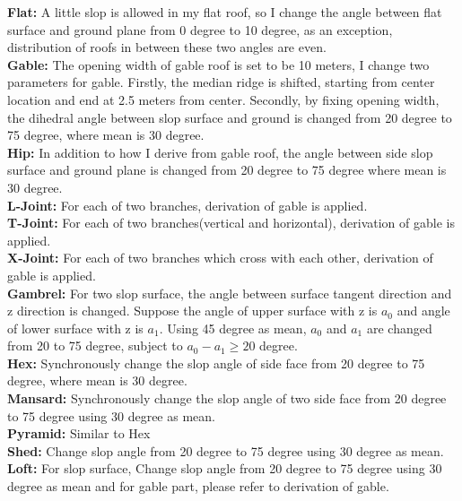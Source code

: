 \documentclass{iitthesis}
\begin{document}
{\noindent \textbf{Flat:}} A little slop is allowed in my flat roof, so I change the angle between flat surface and ground plane from 0 degree to 10 degree, as an exception, distribution of roofs in between these two angles are even.
\\ \textbf{Gable:} The opening width of gable roof is set to be 10 meters, I change two parameters for gable. Firstly, the median ridge is shifted, starting from center location and end at 2.5 meters from center. Secondly, by fixing opening width, the dihedral angle between slop surface and ground is changed from 20 degree to 75 degree, where mean is 30 degree.
\\ \textbf{Hip:} In addition to how I derive from gable roof, the angle between side slop surface and ground plane is changed from 20 degree to 75 degree where mean is 30 degree.
\\ \textbf{L-Joint:} For each of two branches, derivation of gable is applied.
\\ \textbf{T-Joint:} For each of two branches(vertical and horizontal), derivation of gable is applied.
\\ \textbf{X-Joint:} For each of two branches which cross with each other, derivation of gable is applied.
\\ \textbf{Gambrel:} For two slop surface, the angle between surface tangent direction and z direction is changed. Suppose the angle of upper surface with z is $a_0$ and angle of lower surface with z is $a_1$. Using 45 degree as mean, $a_0$ and $a_1$ are changed from 20 to 75 degree, subject to $a_0-a_1\geq 20$ degree.
\\ \textbf{Hex:} Synchronously change the slop angle of side face from 20 degree to 75 degree, where mean is 30 degree.
\\ \textbf{Mansard:} Synchronously change the slop angle of two side face from 20 degree to 75 degree using 30 degree as mean.
\\ \textbf{Pyramid:} Similar to Hex
\\ \textbf{Shed:} Change slop angle from 20 degree to 75 degree using 30 degree as mean.
\\ \textbf{Loft:} For slop surface, Change slop angle from 20 degree to 75 degree using 30 degree as mean and for gable part, please refer to derivation of gable.
\end{document}
